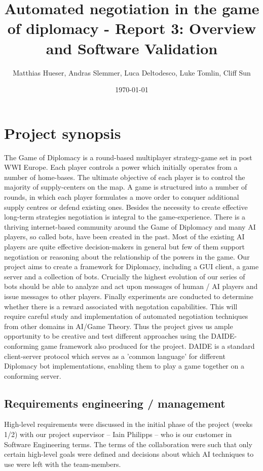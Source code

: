 \documentclass[11pt]{article}
\title{Automated negotiation in the game of diplomacy - Report 3: Overview and Software Validation}
\author{Matthias Hueser, Andras Slemmer, Luca Deltodesco, Luke Tomlin, Cliff Sun}
\date{\today}
\begin{document}
\maketitle

\section{Project synopsis}
The Game of Diplomacy is a round-based multiplayer strategy-game set in post WWI
Europe. Each player controls a power which initially operates from a number of 
home-bases. The ultimate objective of each player is to control the majority of
supply-centers on the map. A game is structured into a number of rounds, in which
each player formulates a move order to conquer additional supply centres or
defend existing ones. Besides the necessity to create effective long-term
strategies negotiation is integral to the game-experience. There is a thriving
internet-based community around the Game of Diplomacy and many AI players, so
called bots, have been created in the past. Most of the existing AI players are
quite effective decision-makers in general but few of them support negotiation
or reasoning about the relationship of the powers in the game. Our project aims
to create a framework for Diplomacy, including a GUI client, a game server and a
collection of bots. Crucially the highest evolution of our series
of bots should be able to analyze and act upon messages of human / AI players and
issue messages to other players. Finally experiments are conducted to determine whether
there is a reward associated with negotation capabilities. This will require
careful study and implementation of automated negotiation techniques from other 
domains in AI/Game Theory. Thus the project gives us ample opportunity to be
creative and test different approaches using the DAIDE-conforming game framework
also produced for the project. DAIDE is a standard client-server protocol which
serves as a 'common language' for different Diplomacy bot implementations, 
enabling them to play a game together on a conforming server.

\subsection{Requirements engineering / management}
High-level requirements were discussed in the initial phase of the project 
(weeks 1/2) with our project supervisor -- Iain Philipps -- who is our customer
in Software Engineering terms. The terms of the collaboration were such that 
only certain high-level goals were defined and decisions about which AI techniques
to use were left with the team-members.
\end{document}
